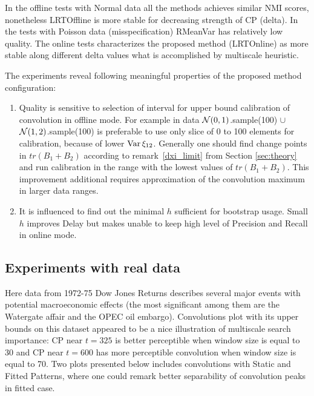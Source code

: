 In the offline tests with Normal data all the methods achieves similar NMI scores, nonetheless LRTOffline is more stable for decreasing strength of CP (delta). In the tests with Poisson data (misspecification) RMeanVar has relatively low quality. The online tests characterizes the proposed method (LRTOnline) as more stable along different delta values what is accomplished by multiscale heuristic.      

 The experiments reveal following meaningful properties of the proposed method configuration:

\begin{enumerate}
\item Quality is sensitive to selection of interval for upper bound calibration of convolution in offline mode. For example in data $\mathcal{N}(0,1)$.sample(100) $\cup$ $\mathcal{N}(1,2)$.sample(100) is preferable to use only slice of 0 to 100 elements for calibration, because of lower $\operatorname{Var} \xi_{12}$.  Generally one should find change points in $tr(B_1 + B_2)$ according to remark~\ref{dxi_limit} from Section \ref{sec:theory} and run calibration in the range with the lowest values of $tr(B_1 + B_2)$. This improvement additional  requires approximation of the convolution maximum in larger data ranges.   

\item It is influenced to find out the minimal $h$ sufficient for bootstrap usage. Small $h$  improves Delay but makes unable to keep high level of  Precision and Recall in online mode. 
\end{enumerate}

\subsection{Experiments with real data}

Here data from 1972-75 Dow Jones Returns  \citet{BayesOnlineWeb}  describes several major events with potential macroeconomic effects (the most significant among them are the Watergate affair and the OPEC oil embargo). 
Convolutions plot with its upper bounds on this dataset appeared to be a nice illustration of multiscale search importance: CP near $t=325$ is better 	
perceptible when window size is equal to 30 and CP near $t=600$ has more perceptible convolution when window size is equal to 70. Two plots presented below includes convolutions with Static and Fitted Patterns, where one could remark better separability of convolution peaks in fitted case.       
 

